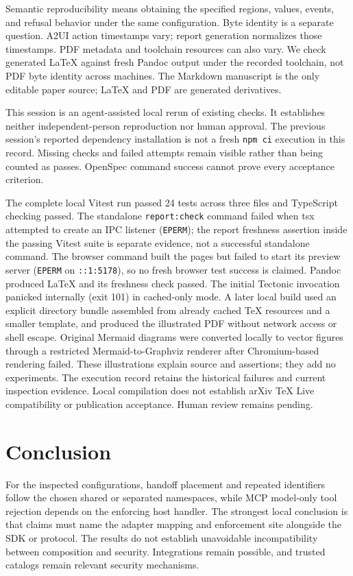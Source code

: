 \documentclass[11pt]{article}
\begin{document}
Semantic reproducibility means obtaining the specified regions, values,
events, and refusal behavior under the same configuration. Byte identity
is a separate question. A2UI action timestamps vary; report generation
normalizes those timestamps. PDF metadata and toolchain resources can
also vary. We check generated LaTeX against fresh Pandoc output under
the recorded toolchain, not PDF byte identity across machines. The
Markdown manuscript is the only editable paper source; LaTeX and PDF are
generated derivatives.

This session is an agent-assisted local rerun of existing checks. It
establishes neither independent-person reproduction nor human approval.
The previous session's reported dependency installation is not a fresh
\texttt{npm\ ci} execution in this record. Missing checks and failed
attempts remain visible rather than being counted as passes. OpenSpec
command success cannot prove every acceptance criterion.

The complete local Vitest run passed 24 tests across three files and
TypeScript checking passed. The standalone \texttt{report:check} command
failed when tsx attempted to create an IPC listener (\texttt{EPERM});
the report freshness assertion inside the passing Vitest suite is
separate evidence, not a successful standalone command. The browser
command built the pages but failed to start its preview server
(\texttt{EPERM} on \texttt{::1:5178}), so no fresh browser test success
is claimed. Pandoc produced LaTeX and its freshness check passed. The
initial Tectonic invocation panicked internally (exit 101) in
cached-only mode. A later local build used an explicit directory bundle
assembled from already cached TeX resources and a smaller template, and
produced the illustrated PDF without network access or shell escape.
Original Mermaid diagrams were converted locally to vector figures
through a restricted Mermaid-to-Graphviz renderer after Chromium-based
rendering failed. These illustrations explain source and assertions;
they add no experiments. The execution record retains the historical
failures and current inspection evidence. Local compilation does not
establish arXiv TeX Live compatibility or publication acceptance. Human
review remains pending.

\section{Conclusion}\label{conclusion}

For the inspected configurations, handoff placement and repeated
identifiers follow the chosen shared or separated namespaces, while MCP
model-only tool rejection depends on the enforcing host handler. The
strongest local conclusion is that claims must name the adapter mapping
and enforcement site alongside the SDK or protocol. The results do not
establish unavoidable incompatibility between composition and security.
Integrations remain possible, and trusted catalogs remain relevant
security mechanisms.
\end{document}
